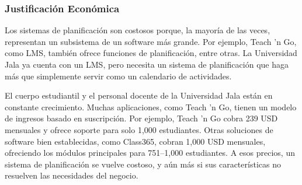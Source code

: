 \subsubsection{Justificación Económica}
Los sistemas de planificación son costosos porque, la mayoría de las veces, representan un subsistema de un software más grande.
Por ejemplo, Teach 'n Go, como LMS, también ofrece funciones de planificación, entre otras. La Universidad Jala ya cuenta con un LMS, pero necesita un sistema de planificación que haga más que simplemente servir como un calendario de actividades.

El cuerpo estudiantil y el personal docente de la Universidad Jala están en constante crecimiento.
Muchas aplicaciones, como Teach 'n Go, tienen un modelo de ingresos basado en suscripción. Por ejemplo, Teach 'n Go cobra 239 USD mensuales y ofrece soporte para solo 1,000 estudiantes. Otras soluciones de software bien establecidas, como Class365, cobran 1,000 USD mensuales, ofreciendo los módulos principales para 751–1,000 estudiantes. A esos precios, un sistema de planificación se vuelve costoso, y aún más si sus características no resuelven las necesidades del negocio.
